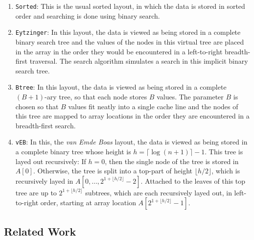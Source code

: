 \documentclass{patmorin}
\begin{document}
\begin{enumerate}
  \item \texttt{Sorted}:  This is the usual sorted layout, in which
  the data is stored in sorted order and searching is done using binary
  search.

  \item \texttt{Eytzinger}: In this layout, the data is viewed as being
  stored in a complete binary search tree and the values of the nodes
  in this virtual tree are placed in the array in the order they would
  be encountered in a left-to-right breadth-first traversal.  The search
  algorithm simulates a search in this implicit binary search tree.


  \item \texttt{Btree}: In this layout, the data is viewed as being stored
  in a complete $(B+1)$-ary tree, so that each node stores $B$ values.
  The parameter $B$ is chosen so that $B$ values fit neatly into a single
  cache line and the nodes of this tree are mapped to array locations in
  the order they are encountered in a breadth-first search.


  \item \texttt{vEB}: In this, the \emph{van Emde Boas} layout,
  the data is viewed as being stored in a complete binary tree
  whose height is $h=\lceil\log (n+1)\rceil -1$. This tree is layed
  out recursively:  If $h=0$, then the single node of the tree is
  stored in $A[0]$.  Otherwise, the tree is split into a top-part
  of height $\lfloor h/2\rfloor$, which is recursively layed in
  $A[0,\ldots,2^{1+\lfloor{h/2\rfloor}}-2]$.  Attached to the leaves of
  this top tree are up to $2^{1+\lfloor{h/2\rfloor}}$ subtrees, which
  are each recursively layed out, in left-to-right order, starting at
  array location $A[2^{1+\lfloor{h/2\rfloor}}-1]$.
\end{enumerate}

\subsection{Related Work}
\end{document}
